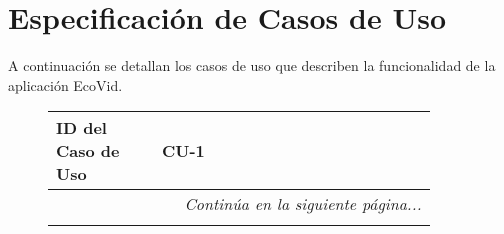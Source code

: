 \section{Especificación de Casos de Uso}
A continuación se detallan los casos de uso que describen la funcionalidad de la aplicación EcoVid.

\begin{figure}[H]
\begin{longtable}{p{0.25\linewidth} p{0.65\linewidth}}
    
    \toprule
    \textbf{ID del Caso de Uso} & CU-1 \\
    \midrule
    \endfirsthead

    

    \bottomrule
    \multicolumn{2}{r}{{\small\textit{Continúa en la siguiente página...}}} \\
    \endfoot

    \endlastfoot


\end{longtable}
\end{figure}
